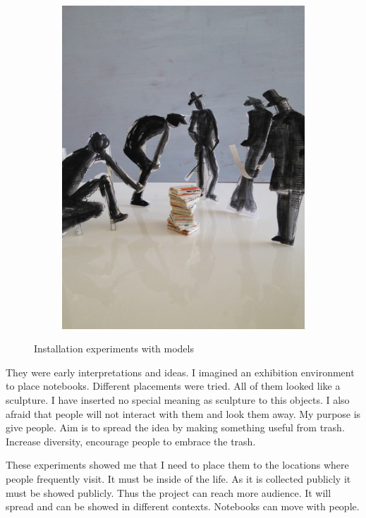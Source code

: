 \begin{figure}
\begin{subfigure}[b]{0.31\textwidth}
    \includegraphics[width=\textwidth]{project_graphics/exhibition3.jpg}
    \label{fig:exhibition3}
  \end{subfigure}
  \caption{Installation experiments with models}
  \label{fig:exhibition}
\end{figure}

They were early interpretations and ideas. I imagined an exhibition environment to place notebooks. Different placements were tried. All of them looked like a sculpture. I have inserted no special meaning as sculpture to this objects. I also afraid that people will not interact with them and look them away. My purpose is give people. Aim is to spread the idea by making something useful from trash. Increase diversity, encourage people to embrace the trash.

These experiments showed me that I need to place them to the locations where people frequently visit. It must be inside of the life. As it is collected publicly it must be showed publicly. Thus the project can reach more audience. It will spread and can be showed in different contexts. Notebooks can move with people.

